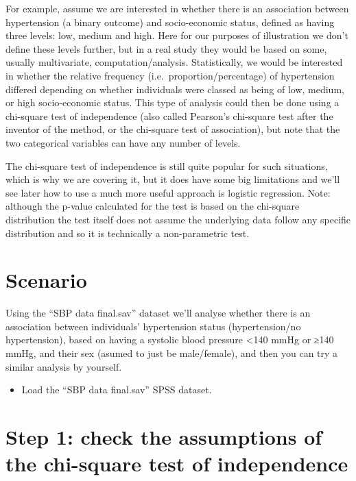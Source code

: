 \documentclass[
]{book}
\providecommand{\tightlist}{%
  \setlength{\itemsep}{0pt}\setlength{\parskip}{0pt}}
\begin{document}
For example, assume we are interested in whether there is an association between hypertension (a binary outcome) and socio-economic status, defined as having three levels: low, medium and high. Here for our purposes of illustration we don't define these levels further, but in a real study they would be based on some, usually multivariate, computation/analysis. Statistically, we would be interested in whether the relative frequency (i.e.~proportion/percentage) of hypertension differed depending on whether individuals were classed as being of low, medium, or high socio-economic status. This type of analysis could then be done using a chi-square test of independence (also called Pearson's chi-square test after the inventor of the method, or the chi-square test of association), but note that the two categorical variables can have any number of levels.

The chi-square test of independence is still quite popular for such situations, which is why we are covering it, but it does have some big limitations and we'll see later how to use a much more useful approach is logistic regression. Note: although the p-value calculated for the test is based on the chi-square distribution the test itself does not assume the underlying data follow any specific distribution and so it is technically a non-parametric test.

\hypertarget{scenario-10}{%
\section{Scenario}\label{scenario-10}}

Using the ``SBP data final.sav'' dataset we'll analyse whether there is an association between individuals' hypertension status (hypertension/no hypertension), based on having a systolic blood pressure \textless140 mmHg or ≥140 mmHg, and their sex (asumed to just be male/female), and then you can try a similar analysis by yourself.

\begin{itemize}
\tightlist
\item
  Load the ``SBP data final.sav'' SPSS dataset.
\end{itemize}

\hypertarget{step-1-check-the-assumptions-of-the-chi-square-test-of-independence}{%
\section{Step 1: check the assumptions of the chi-square test of independence}\label{step-1-check-the-assumptions-of-the-chi-square-test-of-independence}}
\end{document}
